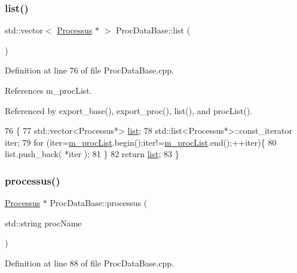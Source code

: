 \subsubsection{\texorpdfstring{list()}{list()}\hspace{0.1cm}{\footnotesize\ttfamily [2/2]}}
{\footnotesize\ttfamily std\+::vector$<$ \hyperlink{classProcessus}{Processus} $\ast$ $>$ Proc\+Data\+Base\+::list (\begin{DoxyParamCaption}{ }\end{DoxyParamCaption})}



Definition at line 76 of file Proc\+Data\+Base.\+cpp.



References m\+\_\+proc\+List.



Referenced by export\+\_\+base(), export\+\_\+proc(), list(), and proc\+List().


\begin{DoxyCode}
76                                            \{
77   std::vector<Processus*> \hyperlink{classProcDataBase_a813dbc8f9e7c4d69074a01394f04fc98}{list};
78   std::list<Processus*>::const\_iterator iter;
79   \textcolor{keywordflow}{for} (iter=\hyperlink{classProcDataBase_a9b7458b811b826c5d264b436c7a391c4}{m\_procList}.begin();iter!=\hyperlink{classProcDataBase_a9b7458b811b826c5d264b436c7a391c4}{m\_procList}.end();++iter)\{
80     list.push\_back( *iter );        
81   \}
82   \textcolor{keywordflow}{return} \hyperlink{classProcDataBase_a813dbc8f9e7c4d69074a01394f04fc98}{list};
83 \}
\end{DoxyCode}
\mbox{\label{classProcDataBase_a839b15c7bc0d73f5ff0f2516c3cb418e}} 
\subsubsection{\texorpdfstring{processus()}{processus()}}
{\footnotesize\ttfamily \hyperlink{classProcessus}{Processus} $\ast$ Proc\+Data\+Base\+::processus (\begin{DoxyParamCaption}\item[{std\+::string}]{proc\+Name }\end{DoxyParamCaption})}



Definition at line 88 of file Proc\+Data\+Base.\+cpp.



